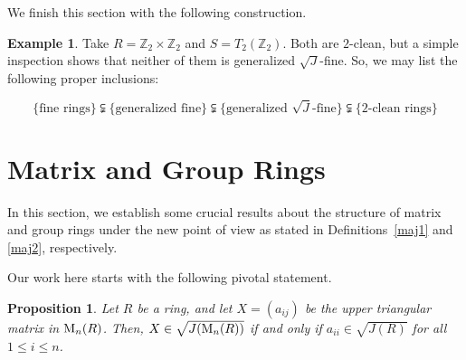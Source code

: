 \documentclass[12pt]{amsart}
\newtheorem{proposition}[theorem]{Proposition}
\theoremstyle{definition}
\newtheorem{example}[theorem]{Example}
\begin{document}
We finish this section with the following construction.

\begin{example}\label{1}
Take \( R = \mathbb{Z}_2 \times \mathbb{Z}_2 \) and \( S = T_2(\mathbb{Z}_2) \). Both are \( 2 \)-clean, but a simple inspection shows that neither of them is generalized \( \sqrt{J} \)-fine. So, we may list the following proper inclusions:

\[
\{\text{fine rings}\} \subsetneqq \{\text{generalized fine}\} \subsetneqq \{\text{generalized $\sqrt{J}$-fine}\} \subsetneqq \{\text{2-clean rings}\}
\]
\end{example}

\section{Matrix and Group Rings}

In this section, we establish some crucial results about the structure of matrix and group rings under the new point of view as stated in Definitions~\ref{maj1} and \ref{maj2}, respectively. 

Our work here starts with the following pivotal statement.

\begin{proposition}\label{lemma2}
Let $R$ be a ring, and let $X =(a_{ij})$ be the upper triangular matrix in ${\rm M}_n(R)$. Then, $X \in \sqrt{J({\rm M}_n(R))}$ if and only if $a_{ii} \in \sqrt{J(R)}$ for all $1 \le i \le n$.
\end{proposition}
\end{document}
